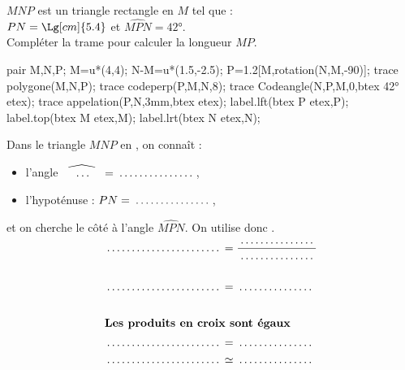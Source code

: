 \begin{exercice*}
    $MNP$ est un triangle rectangle en $M$ tel que :\\$PN=\Lg[cm]{5.4}$ et $\widehat{MPN}=\ang{42}$.\\
    Compléter la trame pour calculer la longueur $MP$.
    \begin{center}
        \begin{Geometrie}[CoinHD={(6u,4.5u)}]        
            pair M,N,P;
            M=u*(4,4);
            N-M=u*(1.5,-2.5);
            P=1.2[M,rotation(N,M,-90)];
            trace polygone(M,N,P);            
            trace codeperp(P,M,N,8);
            trace Codeangle(N,P,M,0,btex \ang{42} etex);
            trace appelation(P,N,3mm,btex  etex);
            label.lft(btex P etex,P);
            label.top(btex M etex,M);
            label.lrt(btex N etex,N);
        \end{Geometrie}
    \end{center}
    Dans le triangle $MNP$ \makebox[0.4\linewidth]{\dotfill} en \makebox[0.1\linewidth]{\dotfill}, on connaît :
    \begin{itemize}        
        \item l'angle $\widehat{\phantom{M}\dots\phantom{N}}=\makebox[0.2\linewidth]{\dotfill}$,
        \item l'hypoténuse : $PN=\makebox[0.2\linewidth]{\dotfill}$,
    \end{itemize}
    et on cherche le côté \makebox[0.3\linewidth]{\dotfill} à l'angle $\widehat{MPN}$. On utilise donc \makebox[0.2\linewidth]{\dotfill}.
    \begin{align*}
        \makebox[0.3\linewidth]{\dotfill}&=\frac{\makebox[0.2\linewidth]{\dotfill}}{\makebox[0.2\linewidth]{\dotfill}}\\
        &\\
        \makebox[0.3\linewidth]{\dotfill}&=\makebox[0.2\linewidth]{\dotfill}\\
        &\\
        \intertext{\centering\bf Les produits en croix sont égaux}
        \makebox[0.3\linewidth]{\dotfill}&=\makebox[0.2\linewidth]{\dotfill}\\        
        \makebox[0.3\linewidth]{\dotfill}&\simeq\makebox[0.2\linewidth]{\dotfill}
    \end{align*}
\end{exercice*}
